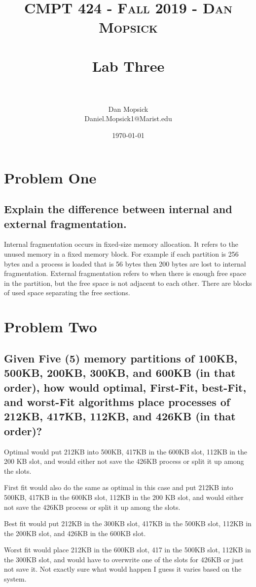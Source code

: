 \documentclass[letterpaper, 10pt,DIV=13]{scrartcl}
\title{	
   \normalfont \normalsize 
   \textsc{CMPT 424 - Fall 2019 - Dan Mopsick} \\[10pt] %
   \horrule{0.5pt} \\[0.25cm] 	%
   \huge Lab Three  \\     	    %
   \horrule{0.5pt} \\[0.25cm] 	%
}
\author{Dan Mopsick \\ \normalsize Daniel.Mopsick1@Marist.edu}
\date{\normalsize\today} 	%
\numberwithin{equation}{section} %
\numberwithin{figure}{section} %
\numberwithin{table}{section} %
\begin{document}
\maketitle %

\section{Problem One}

\subsection{Explain	the	difference	between	internal	and	external	fragmentation.	}

Internal fragmentation occurs in fixed-size memory allocation. It refers to the unused memory in a fixed memory block. For example if each partition is 256 bytes and a process is loaded that is 56 bytes then 200 bytes are lost to internal fragmentation. External fragmentation refers to when there is enough free space in the partition, but the free space is not adjacent to each other. There are blocks of used space separating the free sections.



\section{Problem Two}

\subsection{Given	Five	(5)	memory	partitions	of	100KB,	500KB,	200KB,	300KB,	and	600KB	(in	that	
order),	how	would	optimal,	First-Fit,	best-Fit,	and	worst-Fit	algorithms	place	processes	
of	212KB,	417KB,	112KB,	and	426KB	(in	that	order)?}

Optimal would put 212KB into 500KB, 417KB in the 600KB slot, 112KB in the 200 KB slot, and would either not save the 426KB process or split it up among the slots. 

First fit would also do the same as optimal in this case and put 212KB into 500KB, 417KB in the 600KB slot, 112KB in the 200 KB slot, and would either not save the 426KB process or split it up among the slots.

Best fit would put 212KB in the 300KB slot, 417KB in the 500KB slot, 112KB in the 200KB slot, and 426KB in the 600KB slot.

Worst fit would place 212KB in the 600KB slot, 417 in the 500KB slot, 112KB in the 300KB slot, and would have to overwrite one of the slots for 426KB or just not save it. Not exactly sure what would happen I guess it varies based on the system.
\end{document}
